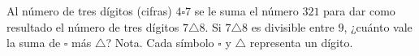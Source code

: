 Al número de tres dígitos (cifras) $4\square 7$ se le suma el número $321$ para dar como resultado el número de tres dígitos $7\triangle 8$. Si $7\triangle 8$ es divisible entre $9$, ¿cuánto vale la suma de $\square$ más $\triangle$?
Nota. Cada símbolo $\square$ y $\triangle$ representa un dígito.